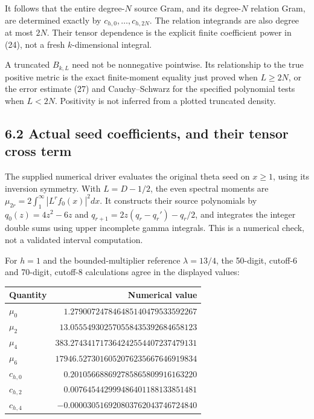 \documentclass[
  11pt,
]{article}
\begin{document}
It follows that the entire degree-\(N\) source Gram, and its
degree-\(N\) relation Gram, are determined exactly by
\(c_{h,0},\ldots,c_{h,2N}\). The relation integrands are also degree at
most \(2N\). Their tensor dependence is the explicit finite coefficient
power in (24), not a fresh \(k\)-dimensional integral.

A truncated \(B_{k,L}\) need not be nonnegative pointwise. Its
relationship to the true positive metric is the exact finite-moment
equality just proved when \(L\ge2N\), or the error estimate (27) and
Cauchy--Schwarz for the specified polynomial tests when \(L<2N\).
Positivity is not inferred from a plotted truncated density.

\subsection{6.2 Actual seed coefficients, and their tensor cross
term}\label{actual-seed-coefficients-and-their-tensor-cross-term}

The supplied numerical driver evaluates the original theta seed on
\(x\ge1\), using its inversion symmetry. With \(L=D-1/2\), the even
spectral moments are \(\mu_{2r}=2\int_1^\infty |L^rf_0(x)|^2dx\). It
constructs their source polynomials by \(q_0(z)=4z^2-6z\) and
\(q_{r+1}=2z(q_r-q_r')-q_r/2\), and integrates the integer double sums
using upper incomplete gamma integrals. This is a numerical check, not a
validated interval computation.

For \(h=1\) and the bounded-multiplier reference \(\lambda=13/4\), the
50-digit, cutoff-6 and 70-digit, cutoff-8 calculations agree in the
displayed values:

\begin{longtable}[]{@{}lr@{}}
\toprule\noalign{}
Quantity & Numerical value \\
\midrule\noalign{}
\endhead
\bottomrule\noalign{}
\endlastfoot
\(\mu_0\) & \(1.279007247846485140479533592267\) \\
\(\mu_2\) & \(13.055549302570558435392684658123\) \\
\(\mu_4\) & \(383.274341717364242554407237479131\) \\
\(\mu_6\) & \(17946.5273016052076235667646919834\) \\
\(c_{h,0}\) & \(0.201056688692785865809916163220\) \\
\(c_{h,2}\) & \(0.007645442999486401188133851481\) \\
\(c_{h,4}\) & \(-0.000030516920803762043746724840\) \\
\end{longtable}
\end{document}

